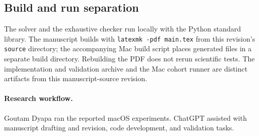 \subsection{Build and run separation}

The solver and the exhaustive checker run locally with the Python standard
library. The manuscript builds with \texttt{latexmk -pdf main.tex} from this
revision's \texttt{source} directory; the accompanying Mac build script places
generated files in a separate build directory. Rebuilding the PDF does not
rerun scientific tests. The implementation and validation archive and the Mac
cohort runner are distinct artifacts from this manuscript-source revision.

\paragraph{Research workflow.}
Goutam Dyapa ran the reported macOS experiments. ChatGPT assisted with
manuscript drafting and revision, code development, and validation tasks.
